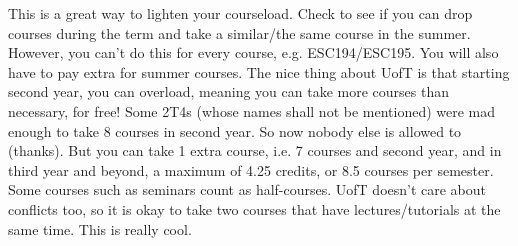 This is a great way to lighten your courseload. Check to see if you can drop courses during the term and take a similar/the same course in the summer. However, you can't do this for every course, e.g. ESC194/ESC195. You will also have to pay extra for summer courses. The nice thing about UofT is that starting second year, you can overload, meaning you can take more courses than necessary, for free! Some 2T4s (whose names shall not be mentioned) were mad enough to take 8 courses in second year. So now nobody else is allowed to (thanks). But you can take 1 extra course, i.e. 7 courses and second year, and in third year and beyond, a maximum of 4.25 credits, or 8.5 courses per semester. Some courses such as seminars count as half-courses. UofT doesn't care about conflicts too, so it is okay to take two courses that have lectures/tutorials at the same time. This is really cool.

